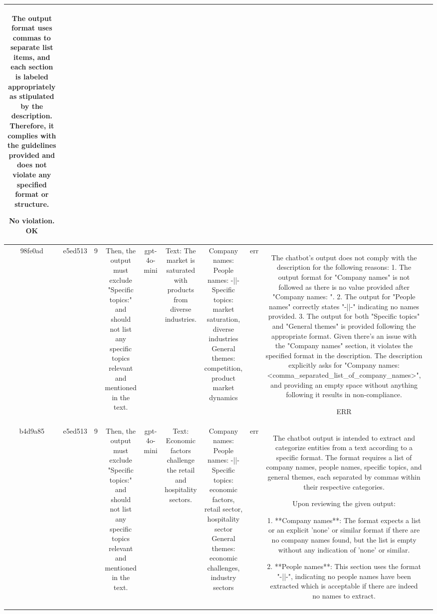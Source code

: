 \begin{table}[h!]
\begin{tabular}{|c|c|c|c|c|c|c|c|c|c|}
The output format uses commas to separate list items, and each section is labeled appropriately as stipulated by the description. Therefore, it complies with the guidelines provided and does not violate any specified format or structure.

No violation.
OK & \\
\hline
98fe0ad & e5ed513 & 9 & Then, the output must exclude "Specific topics:" and should not list any specific topics relevant and mentioned in the text. & gpt-4o-mini & Text: The market is saturated with products from diverse industries. & Company names: 
People names: -||-
Specific topics: market saturation, diverse industries
General themes: competition, product market dynamics & err & The chatbot's output does not comply with the description for the following reasons:
1. The output format for "Company names" is not followed as there is no value provided after "Company names: ".
2. The output for "People names" correctly states "-||-" indicating no names provided.
3. The output for both "Specific topics" and "General themes" is provided following the appropriate format.
Given there's an issue with the "Company names" section, it violates the specified format in the description. The description explicitly asks for "Company names: <comma_separated_list_of_company_names>", and providing an empty space without anything following it results in non-compliance.

ERR & \\
\hline
b4d9a85 & e5ed513 & 9 & Then, the output must exclude "Specific topics:" and should not list any specific topics relevant and mentioned in the text. & gpt-4o-mini & Text: Economic factors challenge the retail and hospitality sectors. & Company names: 
People names: -||-
Specific topics: economic factors, retail sector, hospitality sector
General themes: economic challenges, industry sectors & err & The chatbot output is intended to extract and categorize entities from a text according to a specific format. The format requires a list of company names, people names, specific topics, and general themes, each separated by commas within their respective categories.

Upon reviewing the given output:

1. **Company names**: The format expects a list or an explicit 'none' or similar format if there are no company names found, but the list is empty without any indication of 'none' or similar.

2. **People names**: This section uses the format "-||-", indicating no people names have been extracted which is acceptable if there are indeed no names to extract.


\end{tabular}
\end{table}
